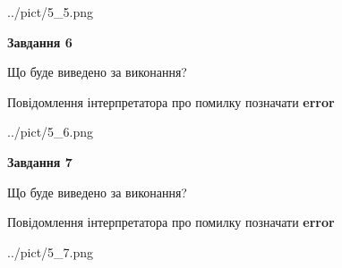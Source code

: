 \documentclass[10pt, ukrainian]{article}
\begin{document}
{\begin {large}
\begin{center}
	{../pict/5_5.png}
\end{center}
\newpage

{\begin {center}\textbf{Завдання 6}\end {center}}\par
Що буде виведено за виконання? \par
Повідомлення інтерпретатора про помилку позначати \textbf{error}

\begin{center}
	{../pict/5_6.png}
\end{center}
\newpage

{\begin {center}\textbf{Завдання 7}\end {center}}\par
Що буде виведено за виконання? \par
Повідомлення інтерпретатора про помилку позначати \textbf{error}

\begin{center}
	{../pict/5_7.png}
\end{center}
\newpage

\end {large}}
\end{document}

